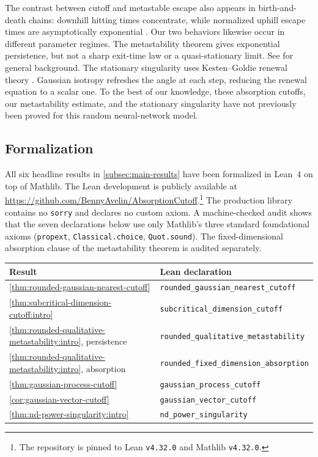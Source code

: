 \documentclass[11pt,reqno,a4paper]{article}
\begin{document}
The contrast between cutoff and metastable escape also appears in
birth-and-death chains: downhill hitting times concentrate, while normalized
uphill escape times are asymptotically exponential
\cite{barrera-bertoncini-fernandez2009}. Our two behaviors likewise occur in
different parameter regimes. The metastability theorem gives exponential
persistence, but not a sharp exit-time law or a quasi-stationary limit. See
\cite{bovier-denhollander2015,collet-martinez-sanmartin2013,
champagnat-villemonais2023} for general background. The stationary singularity
uses Kesten--Goldie renewal theory
\cite{kesten1973,goldie1991,buraczewski-damek-mikosch2016}. Gaussian isotropy
refreshes the angle at each step, reducing the renewal equation to a scalar
one.
To the best of our knowledge, these absorption cutoffs, our metastability
estimate, and the stationary singularity have not previously
been proved for this random neural-network model.

\subsection{Formalization}
\label{subsec:formalization}

All six headline results in \cref{subsec:main-results} have been formalized in
Lean~4 on top of Mathlib. The Lean development is publicly available at
\url{https://github.com/BennyAvelin/AbsorptionCutoff}.\footnote{The repository
is pinned to Lean \texttt{v4.32.0} and Mathlib \texttt{v4.32.0}.}
The production library contains no \texttt{sorry} and declares no custom
axiom. A machine-checked audit shows that the seven declarations below use
only Mathlib's three standard foundational axioms
(\texttt{propext}, \texttt{Classical.choice}, \texttt{Quot.sound}). The
fixed-dimensional absorption clause of the metastability theorem is audited
separately.

\begin{center}
\renewcommand{\arraystretch}{1.2}
\begin{tabular}{ll}
  \toprule
  Result & Lean declaration \\
  \midrule
  \cref{thm:rounded-gaussian-nearest-cutoff}
    & \texttt{rounded\_gaussian\_nearest\_cutoff} \\
  \cref{thm:subcritical-dimension-cutoff:intro}
    & \texttt{subcritical\_dimension\_cutoff} \\
  \cref{thm:rounded-qualitative-metastability:intro}, persistence
    & \texttt{rounded\_qualitative\_metastability} \\
  \cref{thm:rounded-qualitative-metastability:intro}, absorption
    & \texttt{rounded\_fixed\_dimension\_absorption} \\
  \cref{thm:gaussian-process-cutoff}
    & \texttt{gaussian\_process\_cutoff} \\
  \cref{cor:gaussian-vector-cutoff}
    & \texttt{gaussian\_vector\_cutoff} \\
  \cref{thm:nd-power-singularity:intro}
    & \texttt{nd\_power\_singularity} \\
  \bottomrule
\end{tabular}
\end{center}
\end{document}
